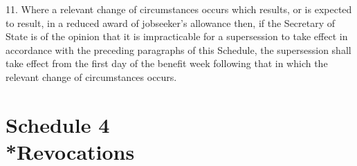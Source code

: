\documentclass[12pt,a4paper]{article}
\begin{document}
\medskip

11.  Where a relevant change of circumstances occurs which results, or is expected to result, in a reduced award of jobseeker’s allowance then, if the Secretary of State is of the opinion that it is impracticable for a supersession to take effect in accordance with the preceding paragraphs of this Schedule, the supersession shall take effect from the first day of the benefit week following that in which the relevant change of circumstances occurs.

\part[Schedule 4 --- Revocations]{Schedule 4\\*Revocations}

\renewcommand\parthead{--- Schedule 4}
\end{document}

